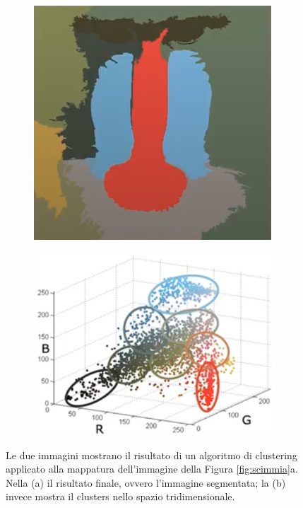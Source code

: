 \begin{figure}[h!]
     \centering
     \begin{subfigure}[b]{0.4\textwidth}
         \centering
         \includegraphics[width=\textwidth]{img/scimmia2.png}
         \caption{}
         \label{fig:y equals x}
     \end{subfigure}
     \hfill
     \begin{subfigure}[b]{0.5\textwidth}
         \centering
         \includegraphics[width=\textwidth]{img/plot-scimmia2.png}
         \caption{}
         \label{fig:three sin x}
     \end{subfigure}
        \caption{Le due immagini mostrano il risultato di un algoritmo di clustering applicato alla mappatura dell'immagine della Figura \ref{fig:scimmia}a. Nella (a) il risultato finale, ovvero l'immagine segmentata; la (b) invece mostra il clusters nello spazio tridimensionale.}
        \label{fig:scimmia2}
\end{figure}




